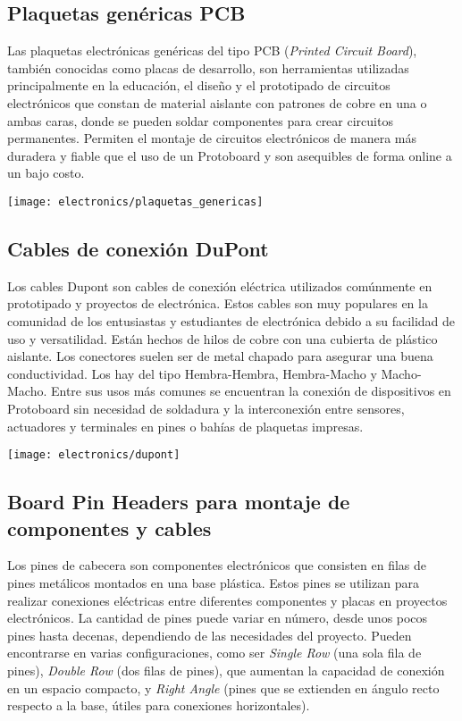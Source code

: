 \subsection{Plaquetas genéricas PCB}
Las plaquetas electrónicas genéricas del tipo PCB (\textit{Printed Circuit Board}), también conocidas como placas de desarrollo, son herramientas utilizadas principalmente en la educación, el diseño y el prototipado de circuitos electrónicos que constan de material aislante con patrones de cobre en una o ambas caras, donde se pueden soldar componentes para crear circuitos permanentes. Permiten el montaje de circuitos electrónicos de manera más duradera y fiable que el uso de un Protoboard y son asequibles de forma online a un bajo costo.

\begin{center}
  \centering
  \texttt{[image: electronics/plaquetas\_genericas]}
  \label{fig:plaquetas_genericas}
\end{center}


\subsection{Cables de conexión DuPont}
Los cables Dupont son cables de conexión eléctrica utilizados comúnmente en prototipado y proyectos de electrónica. Estos cables son muy populares en la comunidad de los entusiastas y estudiantes de electrónica debido a su facilidad de uso y versatilidad. Están hechos de hilos de cobre con una cubierta de plástico aislante. Los conectores suelen ser de metal chapado para asegurar una buena conductividad. Los hay del tipo Hembra-Hembra, Hembra-Macho y Macho-Macho. Entre sus usos más comunes se encuentran la conexión de dispositivos en Protoboard sin necesidad de soldadura y la interconexión entre sensores, actuadores y terminales en pines o bahías de plaquetas impresas.

\begin{center}
  \centering
  \texttt{[image: electronics/dupont]}
  \label{fig:dupont}
\end{center}

\subsection{Board Pin Headers para montaje de componentes y cables}
Los pines de cabecera son componentes electrónicos que consisten en filas de pines metálicos montados en una base plástica. Estos pines se utilizan para realizar conexiones eléctricas entre diferentes componentes y placas en proyectos electrónicos. La cantidad de pines puede variar en número, desde unos pocos pines hasta decenas, dependiendo de las necesidades del proyecto. Pueden encontrarse en varias configuraciones, como ser \textit{Single Row} (una sola fila de pines), \textit{Double Row} (dos filas de pines), que aumentan la capacidad de conexión en un espacio compacto, y \textit{Right Angle} (pines que se extienden en ángulo recto respecto a la base, útiles para conexiones horizontales).

